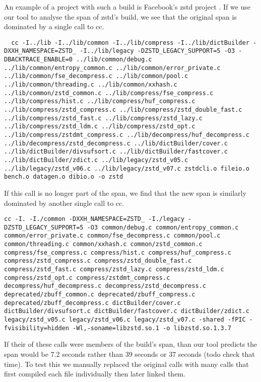 \documentclass[twocolumn,sigplan,10pt,review]{acmart}
\begin{document}
An example of a project with such a build is Facebook's zstd project \cite{}.  If we use our tool
to analyse the span of zstd's build, we see that the original span is dominated by a single call
to cc.
\begin{verbatim}
  cc -I../lib -I../lib/common -I../lib/compress -I../lib/dictBuilder -DXXH_NAMESPACE=ZSTD_ -I../lib/legacy -DZSTD_LEGACY_SUPPORT=5 -O3 -DBACKTRACE_ENABLE=0 ../lib/common/debug.c ../lib/common/entropy_common.c ../lib/common/error_private.c ../lib/common/fse_decompress.c ../lib/common/pool.c ../lib/common/threading.c ../lib/common/xxhash.c ../lib/common/zstd_common.c ../lib/compress/fse_compress.c ../lib/compress/hist.c ../lib/compress/huf_compress.c ../lib/compress/zstd_compress.c ../lib/compress/zstd_double_fast.c ../lib/compress/zstd_fast.c ../lib/compress/zstd_lazy.c ../lib/compress/zstd_ldm.c ../lib/compress/zstd_opt.c ../lib/compress/zstdmt_compress.c ../lib/decompress/huf_decompress.c ../lib/decompress/zstd_decompress.c ../lib/dictBuilder/cover.c ../lib/dictBuilder/divsufsort.c ../lib/dictBuilder/fastcover.c ../lib/dictBuilder/zdict.c ../lib/legacy/zstd_v05.c ../lib/legacy/zstd_v06.c ../lib/legacy/zstd_v07.c zstdcli.o fileio.o bench.o datagen.o dibio.o -o zstd
\end{verbatim}

If this call is no longer part of the span, we find that the new span is similarly dominated by
another single call to cc.

\begin{verbatim}
cc -I. -I./common -DXXH_NAMESPACE=ZSTD_ -I./legacy -DZSTD_LEGACY_SUPPORT=5 -O3 common/debug.c common/entropy_common.c common/error_private.c common/fse_decompress.c common/pool.c common/threading.c common/xxhash.c common/zstd_common.c compress/fse_compress.c compress/hist.c compress/huf_compress.c compress/zstd_compress.c compress/zstd_double_fast.c compress/zstd_fast.c compress/zstd_lazy.c compress/zstd_ldm.c compress/zstd_opt.c compress/zstdmt_compress.c decompress/huf_decompress.c decompress/zstd_decompress.c deprecated/zbuff_common.c deprecated/zbuff_compress.c deprecated/zbuff_decompress.c dictBuilder/cover.c dictBuilder/divsufsort.c dictBuilder/fastcover.c dictBuilder/zdict.c legacy/zstd_v05.c legacy/zstd_v06.c legacy/zstd_v07.c -shared -fPIC -fvisibility=hidden -Wl,-soname=libzstd.so.1 -o libzstd.so.1.3.7
\end{verbatim}

If their of these calls were members of the build's span, than our tool predicts the span would be
7.2 seconds rather than 39 seconds or 37 seconds (todo check that time).  To test this we manually
replaced the original calls with many calls that first compiled each file individually then later
linked them.  %
\end{document}
